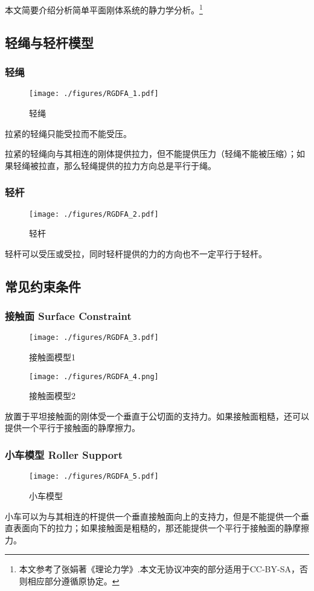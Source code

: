 
本文简要介绍分析简单平面刚体系统的静力学分析。\footnote{本文参考了张娟著《理论力学》.本文无协议冲突的部分适用于CC-BY-SA，否则相应部分遵循原协定。}

\subsection{轻绳与轻杆模型}
\subsubsection{轻绳}
\begin{figure}[ht]
\centering
\texttt{[image: ./figures/RGDFA\_1.pdf]}
\caption{轻绳} \label{RGDFA_fig1}
\end{figure}
拉紧的轻绳只能受拉而不能受压。

拉紧的轻绳向与其相连的刚体提供拉力，但不能提供压力（轻绳不能被压缩）；如果轻绳被拉直，那么轻绳提供的拉力方向总是平行于绳。

\subsubsection{轻杆}
\begin{figure}[ht]
\centering
\texttt{[image: ./figures/RGDFA\_2.pdf]}
\caption{轻杆} \label{RGDFA_fig2}
\end{figure}
轻杆可以受压或受拉，同时轻杆提供的力的方向也不一定平行于轻杆。

\subsection{常见约束条件}
\subsubsection{接触面 Surface Constraint}
\begin{figure}[ht]
\centering
\texttt{[image: ./figures/RGDFA\_3.pdf]}
\caption{接触面模型1} \label{RGDFA_fig3}
\end{figure}
\begin{figure}[ht]
\centering
\texttt{[image: ./figures/RGDFA\_4.png]}
\caption{接触面模型2} \label{RGDFA_fig4}
\end{figure}
放置于平坦接触面的刚体受一个垂直于公切面的支持力。如果接触面粗糙，还可以提供一个平行于接触面的静摩擦力。
\subsubsection{小车模型 Roller Support}
\begin{figure}[ht]
\centering
\texttt{[image: ./figures/RGDFA\_5.pdf]}
\caption{小车模型} \label{RGDFA_fig5}
\end{figure}
小车可以为与其相连的杆提供一个垂直接触面向上的支持力，但是不能提供一个垂直表面向下的拉力；如果接触面是粗糙的，那还能提供一个平行于接触面的静摩擦力。
